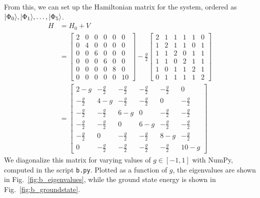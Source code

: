 From this, we can set up the Hamiltonian matrix for the system, ordered as $\lvert\Phi_0\rangle, \lvert\Phi_1\rangle, \ldots, \lvert\Phi_5\rangle$.
\begin{align*}
    H &= H_0 + V \\
    &=
    \begin{bmatrix}
        2 & 0 & 0 & 0 & 0 & 0 \\
        0 & 4 & 0 & 0 & 0 & 0 \\
        0 & 0 & 6 & 0 & 0 & 0 \\
        0 & 0 & 0 & 6 & 0 & 0 \\
        0 & 0 & 0 & 0 & 8 & 0 \\
        0 & 0 & 0 & 0 & 0 & 10
    \end{bmatrix}
    - \frac{g}{2}
    \begin{bmatrix}
        2 & 1 & 1 & 1 & 1 & 0 \\
        1 & 2 & 1 & 1 & 0 & 1 \\
        1 & 1 & 2 & 0 & 1 & 1 \\
        1 & 1 & 0 & 2 & 1 & 1 \\
        1 & 0 & 1 & 1 & 2 & 1 \\
        0 & 1 & 1 & 1 & 1 & 2
    \end{bmatrix} \\
    &=
    \begin{bmatrix}
        2 - g & - \frac{g}{2} & - \frac{g}{2} & - \frac{g}{2} & - \frac{g}{2} & 0 \\
        - \frac{g}{2} & 4 - g & - \frac{g}{2} & - \frac{g}{2} & 0 & - \frac{g}{2} \\
        - \frac{g}{2} & - \frac{g}{2} & 6 - g & 0 & - \frac{g}{2} & - \frac{g}{2} \\
        - \frac{g}{2} & - \frac{g}{2} & 0 & 6 - g & - \frac{g}{2} & - \frac{g}{2} \\
        - \frac{g}{2} & 0 & - \frac{g}{2} & - \frac{g}{2} & 8 - g & - \frac{g}{2} \\
        0 & - \frac{g}{2} & - \frac{g}{2} & - \frac{g}{2} & - \frac{g}{2} & 10 - g
    \end{bmatrix}
\end{align*}
We diagonalize this matrix for varying values of $g \in [-1, 1]$ with NumPy, computed in the script \verb|b.py|.
Plotted as a function of $g$, the eigenvalues are shown in Fig.~\ref{fig:b_eigenvalues}, while the ground state energy is shown in Fig.~\ref{fig:b_groundstate}.

